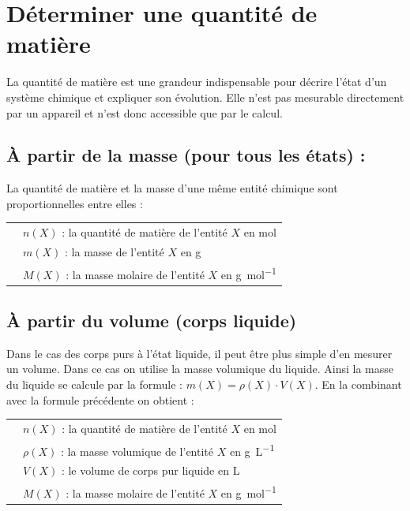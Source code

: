 \documentclass[a4paper,11pt,fleqn]{scrartcl}%
\begin{document}
	\section{Déterminer une quantité de matière}
	La quantité de matière est une grandeur indispensable pour décrire l’état d’un système chimique et expliquer son évolution. Elle n’est pas mesurable directement par un appareil et n’est donc accessible que par le calcul.
		\subsection{À partir de la masse (pour tous les états) :}
		La quantité de matière et la masse d'une même entité chimique sont proportionnelles entre elles :\\
		\begin{tabular}{>{\centering} m{6cm}|m{12cm}}
			\multirow{3}{*}{$n(X) = \dfrac{m(X)}{M(X)}$} & $n(X)$ : la quantité de matière de l'entité $X$ en \unit{\mole}\\
			& $m(X)$ : la masse de l'entité $X$ en \unit{\gram}\\
			& $M(X)$ : la masse molaire de l'entité $X$ en \unit{\gram \per \mole}\\
		\end{tabular}
	
	\subsection{À partir du volume (corps liquide)}
	Dans le cas des corps purs à l’état liquide, il peut être plus simple d’en mesurer un volume. Dans ce cas on utilise la masse volumique du liquide. Ainsi la masse du liquide se calcule par la formule :  $m(X)=\rho(X)\cdot V(X)$. En la combinant avec la formule précédente on obtient :\\
		\begin{tabular}{>{\centering} m{6cm}|m{12cm}}
			\multirow{4}{*}{$n(X) = \rho(X)\cdot \dfrac{V(X)}{M(X)}$} & $n(X)$ : la quantité de matière de l'entité $X$ en \unit{\mole}\\
			&$\rho(X)$ : la masse volumique de l'entité $X$ en \unit{\gram\per\liter}\\
			& $V(X)$ : le volume de corps pur liquide en \unit{\liter}\\
			& $M(X)$ : la masse molaire de l'entité $X$ en \unit{\gram \per \mole}\\
		\end{tabular}
		
\end{document}
